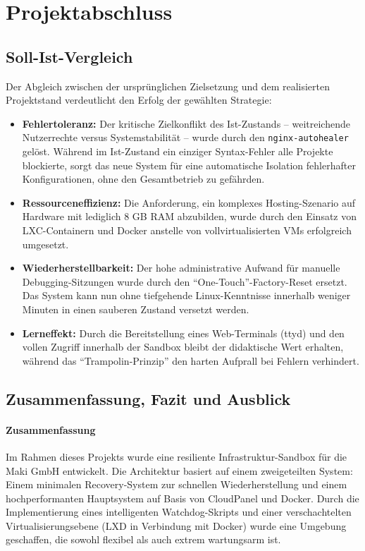 \documentclass[11pt,
a4paper,
numbers=nonperiod,
footsepline,
oneside,
numbers=noenddot,
bibliography=totoc
]{scrartcl}
\begin{document}
\newpage
\section{Projektabschluss}

\subsection{Soll-Ist-Vergleich}

Der Abgleich zwischen der ursprünglichen Zielsetzung und dem realisierten Projektstand verdeutlicht den Erfolg der gewählten Strategie:

\begin{itemize}
	\item \textbf{Fehlertoleranz:} Der kritische Zielkonflikt des Ist-Zustands – weitreichende Nutzerrechte versus Systemstabilität – wurde durch den \texttt{nginx-autohealer} gelöst. Während im Ist-Zustand ein einziger Syntax-Fehler alle Projekte blockierte, sorgt das neue System für eine automatische Isolation fehlerhafter Konfigurationen, ohne den Gesamtbetrieb zu gefährden.
	\item \textbf{Ressourceneffizienz:} Die Anforderung, ein komplexes Hosting-Szenario auf Hardware mit lediglich 8 GB RAM abzubilden, wurde durch den Einsatz von LXC-Containern und Docker anstelle von vollvirtualisierten VMs erfolgreich umgesetzt.
	\item \textbf{Wiederherstellbarkeit:} Der hohe administrative Aufwand für manuelle Debugging-Sitzungen wurde durch den "`One-Touch"'-Factory-Reset ersetzt. Das System kann nun ohne tiefgehende Linux-Kenntnisse innerhalb weniger Minuten in einen sauberen Zustand versetzt werden.
	\item \textbf{Lerneffekt:} Durch die Bereitstellung eines Web-Terminals (ttyd) und den vollen Zugriff innerhalb der Sandbox bleibt der didaktische Wert erhalten, während das "`Trampolin-Prinzip"' den harten Aufprall bei Fehlern verhindert.
\end{itemize}

\subsection{Zusammenfassung, Fazit und Ausblick}

\paragraph{Zusammenfassung}
Im Rahmen dieses Projekts wurde eine resiliente Infrastruktur-Sandbox für die Maki GmbH entwickelt. Die Architektur basiert auf einem zweigeteilten System: Einem minimalen Recovery-System zur schnellen Wiederherstellung und einem hochperformanten Hauptsystem auf Basis von CloudPanel und Docker. Durch die Implementierung eines intelligenten Watchdog-Skripts und einer verschachtelten Virtualisierungsebene (LXD in Verbindung mit Docker) wurde eine Umgebung geschaffen, die sowohl flexibel als auch extrem wartungsarm ist.
\end{document}
